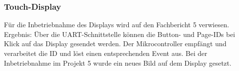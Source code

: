 \subsubsection{Touch-Display}
\label{subsubsec:Inbetriebnahme_Touch_Display}

Für die Inbetriebnahme des Displays wird auf den Fachbericht 5 verwiesen. Ergebnis: Über die UART-Schnittstelle können die Button- und Page-IDs bei Klick auf das Display gesendet werden. Der Mikrocontroller empfängt und verarbeitet die ID und löst einen entsprechenden Event aus. Bei der Inbetriebnahme im Projekt 5 wurde ein neues Bild auf dem Display gesetzt.